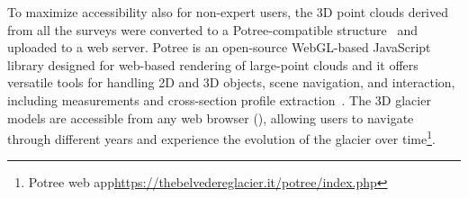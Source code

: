 To maximize accessibility also for non-expert users, the 3D point clouds derived from all the surveys were converted to a Potree-compatible structure~\citep{schutz2016potree} and uploaded to a web server.
Potree is an open-source WebGL-based JavaScript library designed for web-based rendering of large-point 
clouds and it offers versatile tools for handling 2D and 3D objects, scene navigation, and interaction, including measurements and cross-section profile extraction~\citep{Gaspari2024, Fascia2024}.
The 3D glacier models are accessible from any web browser (), allowing users to navigate through different years and experience the evolution of the glacier over time\footnote{Potree web app\label{the-belvedere-glacier-website}\url{https://thebelvedereglacier.it/potree/index.php}}.

